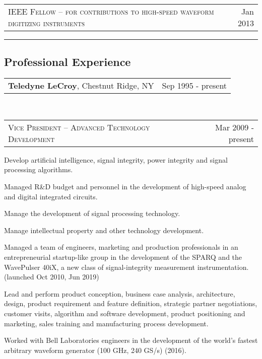 \documentclass[10pt,letterpaper]{extarticle}
\makeatletter
\newcommand{\headerrow}[2]
{\begin{tabular*}{\linewidth}{l@{\extracolsep{\fill}}r}
	#1 &
	#2 \\
\end{tabular*}}
\makeatother
\begin{document}
	\item[]
	\headerrow
		{\large \textsc{IEEE Fellow -- for contributions to high-speed waveform digitizing instruments}}
		{Jan 2013}
\hrule
\vspace{-1em}\subsection*{\Large Professional Experience}\vspace{-0.5em}
	\headerrow
		{\large \textbf{Teledyne LeCroy}, Chestnut Ridge, NY}
		{Sep 1995 - present}
	\\
	\headerrow
		{\large \textsc{Vice President – Advanced Technology Development}}
		{Mar 2009 - present}\vspace{-\topsep}\begin{itemize*}
		\item Develop artificial intelligence, signal integrity, power integrity and signal processing algorithms.
		\item Managed R\&D budget and personnel in the development of high-speed analog and digital integrated circuits.
		\item Manage the development of signal processing technology.
		\item Manage intellectual property and other technology development.
		\item Managed a team of engineers, marketing and production professionals in an
		entrepreneurial startup-like group in the development of the SPARQ and the WavePulser 40iX, a new class of 
		signal-integrity measurement instrumentation. (launched Oct 2010, Jun 2019)
		\item Lead and perform product conception, business case analysis, architecture,
		design, product requirement and feature definition, strategic partner negotiations, 
		customer visits, algorithm and software development, product positioning and 
		marketing, sales training and manufacturing process development. 
		\item Worked with Bell Laboratories engineers in the development of the world's fastest arbitrary waveform generator (100 GHz, 240 GS/s) (2016).
	\end{itemize*}\vspace{-\topsep}
\end{document}

